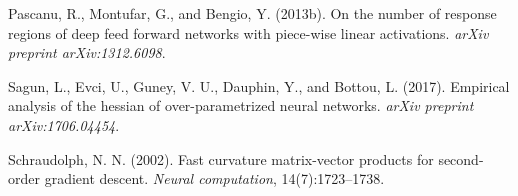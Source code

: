 \documentclass[11pt]{article}
\begin{document}
\begin{thebibliography}{10}
  Pascanu, R., Montufar, G., and Bengio, Y. (2013b).
  \newblock On the number of response regions of deep feed forward networks with piece-wise linear activations.
  \newblock \textit{arXiv preprint arXiv:1312.6098}.

  Sagun, L., Evci, U., Guney, V. U., Dauphin, Y., and Bottou, L. (2017).
  \newblock Empirical analysis of the hessian of over-parametrized neural networks.
  \newblock \textit{arXiv preprint arXiv:1706.04454}.

  Schraudolph, N. N. (2002).
  \newblock Fast curvature matrix-vector products for second-order gradient descent.
  \newblock \textit{Neural computation}, 14(7):1723--1738.
\end{thebibliography}
\end{document}
